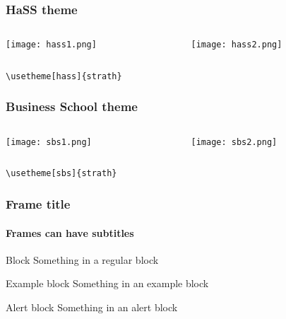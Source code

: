 \documentclass[aspectratio=1610]{beamer}
\begin{document}
\begin{frame}
	\frametitle{HaSS theme}
	\begin{columns}
		\begin{column}{0.47\textwidth}
			\texttt{[image: hass1.png]}
		\end{column}
		\begin{column}{0.47\textwidth}
			\texttt{[image: hass2.png]}
		\end{column}
	\end{columns}
	\vspace{1cm}
	\centering
	\texttt{\textbackslash{}usetheme[hass]\{strath\}}
\end{frame}

\begin{frame}
	\frametitle{Business School theme}
	\begin{columns}
		\begin{column}{0.47\textwidth}
			\texttt{[image: sbs1.png]}
		\end{column}
		\begin{column}{0.47\textwidth}
			\texttt{[image: sbs2.png]}
		\end{column}
	\end{columns}
	\vspace{1cm}
	\centering
	\texttt{\textbackslash{}usetheme[sbs]\{strath\}}
\end{frame}

\begin{frame}
	\frametitle{Frame title}
	\framesubtitle{Frames can have subtitles}
	\begin{block}{Block}
		Something in a regular block
	\end{block}
	\begin{exampleblock}{Example block}
		Something in an example block
	\end{exampleblock}
	\begin{alertblock}{Alert block}
		Something in an alert block
	\end{alertblock}
\end{frame}
\end{document}
